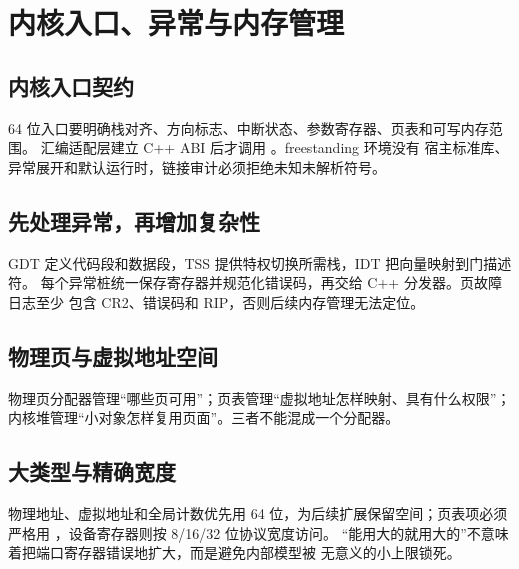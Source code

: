 \chapter{内核入口、异常与内存管理}

\section{内核入口契约}

64 位入口要明确栈对齐、方向标志、中断状态、参数寄存器、页表和可写内存范围。
汇编适配层建立 C++ ABI 后才调用 。freestanding 环境没有
宿主标准库、异常展开和默认运行时，链接审计必须拒绝未知未解析符号。

\section{先处理异常，再增加复杂性}

GDT 定义代码段和数据段，TSS 提供特权切换所需栈，IDT 把向量映射到门描述符。
每个异常桩统一保存寄存器并规范化错误码，再交给 C++ 分发器。页故障日志至少
包含 CR2、错误码和 RIP，否则后续内存管理无法定位。

\section{物理页与虚拟地址空间}

物理页分配器管理“哪些页可用”；页表管理“虚拟地址怎样映射、具有什么权限”；
内核堆管理“小对象怎样复用页面”。三者不能混成一个分配器。

\begin{center}
\end{center}

\section{大类型与精确宽度}

物理地址、虚拟地址和全局计数优先用 64 位，为后续扩展保留空间；页表项必须
严格用 ，设备寄存器则按 8/16/32 位协议宽度访问。
“能用大的就用大的”不意味着把端口寄存器错误地扩大，而是避免内部模型被
无意义的小上限锁死。

